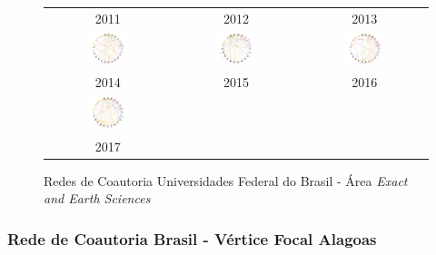 \begin{figure}[H]
\begin{tabular}{ccc}
		2011 & 2012 & 2013\\[6pt]
		\includegraphics[width=0.35\textwidth]{Imagens/rede-exact-br-2014.pdf} &
		\includegraphics[width=0.35\textwidth]{Imagens/rede-exact-br-2015.pdf} &
		\includegraphics[width=0.35\textwidth]{Imagens/rede-exact-br-2016.pdf} \\
		2014 & 2015 & 2016\\[6pt]  \includegraphics[width=0.35\textwidth]{Imagens/rede-exact-br-2017.pdf} & & \\
		2017 & & \\
	\end{tabular}
	\caption{Redes de Coautoria Universidades Federal do Brasil - Área \textit{Exact and Earth Sciences}}
\end{figure}

\subsubsection{Rede de Coautoria Brasil - Vértice Focal Alagoas}

